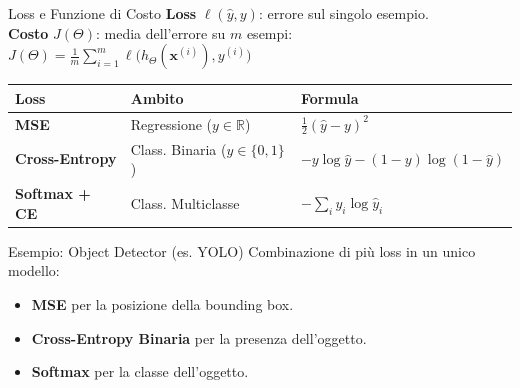 \documentclass[aspectratio=169]{beamer}
\begin{document}
\begin{frame}{Loss e Funzione di Costo}
  \small
  \textbf{Loss} $\ell(\hat{y},y)$: errore sul singolo esempio. \\
  \textbf{Costo} $J(\Theta)$: media dell'errore su $m$ esempi:
  $J(\Theta) = \frac{1}{m}\sum_{i=1}^{m} \ell\big(h_\Theta(\mathbf{x}^{(i)}), y^{(i)}\big)$

  \vspace{0.2cm}

  \begin{center}
    \footnotesize
    \begin{tabular}{lll}
      \toprule
      \textbf{Loss} & \textbf{Ambito} & \textbf{Formula} \\
      \midrule
      \textbf{MSE} & Regressione ($y \in \mathbb{R}$) & $\frac{1}{2}(\hat{y}-y)^2$ \\[2pt]
      \textbf{Cross-Entropy} & Class. Binaria ($y \in \{0,1\}$) & $-y\log\hat{y}-(1-y)\log(1-\hat{y})$ \\[2pt]
      \textbf{Softmax + CE} & Class. Multiclasse & $-\sum_{i} y_i \log \hat{y}_i$ \\
      \bottomrule
    \end{tabular}
  \end{center}

  \vspace{0.1cm}

  \begin{block}{Esempio: Object Detector (es. YOLO)}
    \scriptsize
    Combinazione di più loss in un unico modello:
    \begin{itemize}
      \item \textbf{MSE} per la posizione della bounding box.
      \item \textbf{Cross-Entropy Binaria} per la presenza dell'oggetto.
      \item \textbf{Softmax} per la classe dell'oggetto.
    \end{itemize}
  \end{block}
\end{frame}


\end{document}
